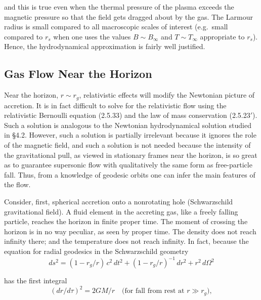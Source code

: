 and this is true even when the thermal pressure of the plasma exceeds the
magnetic pressure so that the field gets dragged about by the gas.  The Larmour
radius is small compared to all macroscopic scales of interest (e.g.\ small compared
to $r_s$ when one uses the values $B \sim B_\infty$ and $T \sim T_\infty$ appropriate to $r_s$).  Hence,
the hydrodynamical approximation is fairly well justified.


\subsection{Gas Flow Near the Horizon}
\label{sec:4.7}

Near the horizon, $r \sim r_g$, relativistic effects will modify the Newtonian picture
of accretion.  It is in fact difficult to solve for the relativistic flow using the
relativistic Bernoulli equation (2.5.33) and the law of mass conservation (2.5.23$'$).
Such a solution is analogous to the Newtonian hydrodynamical solution studied
in \S4.2.  However, such a solution is partially irrelevant because it ignores the
role of the magnetic field, and such a solution is not needed because the intensity
of the gravitational pull, as viewed in stationary frames near the horizon, is so
great as to guarantee supersonic flow with qualitatively the same form as free-particle
fall.  Thus, from a knowledge of geodesic orbits one can infer the main
features of the flow.

Consider, first, spherical accretion onto a nonrotating hole (Schwarzschild
gravitational field).  A fluid element in the accreting gas, like a freely falling
particle, reaches the horizon in finite proper time.  The moment of crossing the
horizon is in no way peculiar, as seen by proper time.  The density does not
reach infinity there; and the temperature does not reach infinity.  In fact,
because the equation for radial geodesics in the Schwarzschild geometry
%
\begin{equation}
ds^2 = (1 - r_g/r)\,c^2\,dt^2 + (1 - r_g/r)^{-1}\,dr^2 + r^2\,d\Omega^2
\tag{4.7.1}
\end{equation}

has the first integral
%
\begin{equation}
(dr/d\tau)^2 = 2GM/r \quad\text{(for fall from rest at } r \gg r_g\text{)},
\tag{4.7.2}
\end{equation}

